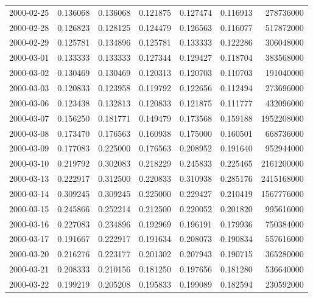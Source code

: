 \begin{tabular}{lrrrrrr}
2000-02-25 &    0.136068 &    0.136068 &    0.121875 &    0.127474 &    0.116913 &   278736000 \\
2000-02-28 &    0.126823 &    0.128125 &    0.124479 &    0.126563 &    0.116077 &   517872000 \\
2000-02-29 &    0.125781 &    0.134896 &    0.125781 &    0.133333 &    0.122286 &   306048000 \\
2000-03-01 &    0.133333 &    0.133333 &    0.127344 &    0.129427 &    0.118704 &   383568000 \\
2000-03-02 &    0.130469 &    0.130469 &    0.120313 &    0.120703 &    0.110703 &   191040000 \\
2000-03-03 &    0.120833 &    0.123958 &    0.119792 &    0.122656 &    0.112494 &   273696000 \\
2000-03-06 &    0.123438 &    0.132813 &    0.120833 &    0.121875 &    0.111777 &   432096000 \\
2000-03-07 &    0.156250 &    0.181771 &    0.149479 &    0.173568 &    0.159188 &  1952208000 \\
2000-03-08 &    0.173470 &    0.176563 &    0.160938 &    0.175000 &    0.160501 &   668736000 \\
2000-03-09 &    0.177083 &    0.225000 &    0.176563 &    0.208952 &    0.191640 &   952944000 \\
2000-03-10 &    0.219792 &    0.302083 &    0.218229 &    0.245833 &    0.225465 &  2161200000 \\
2000-03-13 &    0.222917 &    0.312500 &    0.220833 &    0.310938 &    0.285176 &  2415168000 \\
2000-03-14 &    0.309245 &    0.309245 &    0.225000 &    0.229427 &    0.210419 &  1567776000 \\
2000-03-15 &    0.245866 &    0.252214 &    0.212500 &    0.220052 &    0.201820 &   995616000 \\
2000-03-16 &    0.227083 &    0.234896 &    0.192969 &    0.196191 &    0.179936 &   750384000 \\
2000-03-17 &    0.191667 &    0.222917 &    0.191634 &    0.208073 &    0.190834 &   557616000 \\
2000-03-20 &    0.216276 &    0.223177 &    0.201302 &    0.207943 &    0.190715 &   365280000 \\
2000-03-21 &    0.208333 &    0.210156 &    0.181250 &    0.197656 &    0.181280 &   536640000 \\
2000-03-22 &    0.199219 &    0.205208 &    0.195833 &    0.199089 &    0.182594 &   230592000 \\

\end{tabular}
